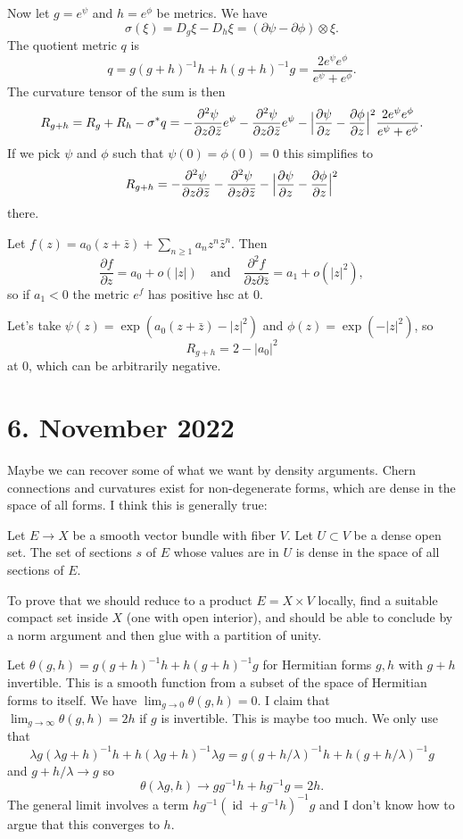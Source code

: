 \documentclass[11pt]{amsart}
\theoremstyle{definition}
\def\qandq{\quad\text{and}\quad}
\DeclareMathOperator{\id}{id}
\begin{document}
Now let $g = e^\psi$ and $h = e^\phi$ be metrics.
We have
$$
\sigma(\xi)
= D_{g} \xi - D_h \xi
= (\partial \psi - \partial \phi) \otimes \xi.
$$
The quotient metric $q$ is
$$
q
= g (g+h)^{-1} h + h (g+h)^{-1} g
= \frac{2 e^\psi e^\phi}{e^\psi + e^\phi}.
$$
The curvature tensor of the sum is then
$$
R_{g+h}
= R_g + R_h - \sigma^* q
= - \frac{\partial^2 \psi}{\partial z \partial \bar z} e^\psi
- \frac{\partial^2 \psi}{\partial z \partial \bar z} e^\psi
- \Bigl|
\frac{\partial \psi}{\partial z} - \frac{\partial \phi}{\partial z}
\Bigr|^2
\frac{2 e^\psi e^\phi}{e^\psi + e^\phi}.
$$
If we pick $\psi$ and $\phi$ such that $\psi(0) = \phi(0) = 0$ this
simplifies to
$$
R_{g+h}
= - \frac{\partial^2 \psi}{\partial z \partial \bar z}
- \frac{\partial^2 \psi}{\partial z \partial \bar z}
- \Bigl|
\frac{\partial \psi}{\partial z} - \frac{\partial \phi}{\partial z}
\Bigr|^2
$$
there.

Let $f(z) = a_0 (z + \bar z) + \sum_{n \geq 1} a_n z^n \bar z^n$.
Then
$$
\frac{\partial f}{\partial z} = a_0 + o(|z|)
\qandq
\frac{\partial^2 f}{\partial z \partial \bar z}
= a_1 + o(|z|^2),
$$
so if $a_1 < 0$ the metric $e^f$ has positive hsc at $0$.

Let's take $\psi(z) = \exp(a_0(z + \bar z) - |z|^2)$ and $\phi(z) = \exp(-
|z|^2)$, so
$$
R_{g+h} = 2 - |a_0|^2
$$
at $0$, which can be arbitrarily negative.



\section{6. November 2022}

Maybe we can recover some of what we want by density arguments.
Chern connections and curvatures exist for non-degenerate forms, which are
dense in the space of all forms.
I think this is generally true:

Let $E \to X$ be a smooth vector bundle with fiber $V$.
Let $U \subset V$ be a dense open set.
The set of sections $s$ of $E$ whose values are in $U$ is dense in the space of
all sections of $E$.

To prove that we should reduce to a product $E = X \times V$ locally, find a
suitable compact set inside $X$ (one with open interior), and should be able to
conclude by a norm argument and then glue with a partition of unity.


\medskip

Let $\theta(g,h) = g (g+h)^{-1} h + h (g+h)^{-1} g$ for Hermitian forms $g,h$
with $g+h$ invertible.
This is a smooth function from a subset of the space of Hermitian forms to
itself.
We have $\lim_{g \to 0} \theta(g,h) = 0$.
I claim that $\lim_{g \to \infty} \theta(g,h) = 2 h$ if $g$ is invertible.
This is maybe too much. We only use that
$$
\lambda g (\lambda g + h)^{-1} h + h (\lambda g + h)^{-1} \lambda g
= g (g + h/\lambda)^{-1} h + h (g + h / \lambda)^{-1} g
$$
and $g + h/\lambda \to g$ so
$$
\theta(\lambda g,h)
\to g g^{-1} h + h g^{-1} g = 2 h.
$$
The general limit involves a term $h g^{-1}(\id + g^{-1}h)^{-1}g$ and I don't
know how to argue that this converges to $h$.
\end{document}
